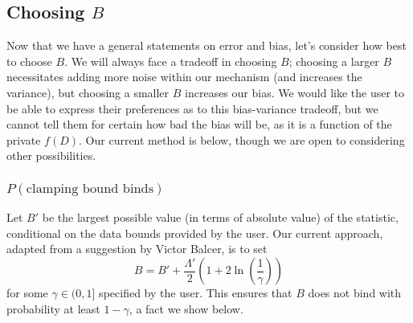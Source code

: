 \documentclass[11pt]{scrartcl} %
\begin{document}
\subsection{Choosing $B$}
\label{subsec:choosing_B}
Now that we have a general statements on error and bias, let's consider how best to choose $B$.
We will always face a tradeoff in choosing $B$; choosing a larger $B$ necessitates adding more noise within
our mechanism (and increases the variance), but choosing a smaller $B$ increases our bias.
We would like the user to be able to express their preferences as to this bias-variance tradeoff,
but we cannot tell them for certain how bad the bias will be, as it is a function of the private $f(D)$.
Our current method is below, though we are open to considering other possibilities.

\subsubsection{$P(\text{clamping bound binds})$}
\label{subsubsec:p_clamp_bound_binds}
Let $B'$ be the largest possible value (in terms of absolute value) of the statistic, conditional on the data bounds provided
by the user. Our current approach, adapted from a suggestion by Victor Balcer, is to set
\[ B = B' + \frac{\Lambda'}{2} \left(1 + 2\ln \left( \frac{1}{\gamma} \right) \right) \]
for some $\gamma \in (0,1]$ specified by the user. This ensures that $B$ does not bind with probability at least $1 - \gamma$,
a fact we show below. \newline
\end{document}
